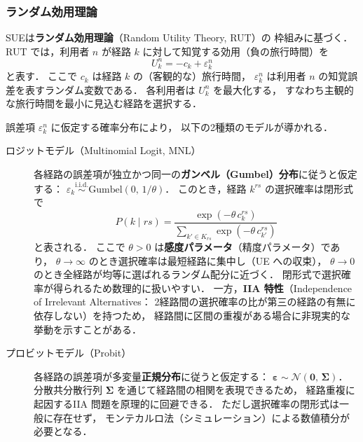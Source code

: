 \subsubsection*{ランダム効用理論}

SUEは\textbf{ランダム効用理論}（Random Utility Theory, RUT）の
枠組みに基づく\cite{McFadden1974}．
RUT では，利用者 $n$ が経路 $k$ に対して知覚する効用（負の旅行時間）を
\begin{equation}
  U_k^n = -c_k + \varepsilon_k^n
  \label{eq:rum}
\end{equation}
と表す．
ここで $c_k$ は経路 $k$ の（客観的な）旅行時間，
$\varepsilon_k^n$ は利用者 $n$ の知覚誤差を表すランダム変数である．
各利用者は $U_k^n$ を最大化する，
すなわち主観的な旅行時間を最小に見込む経路を選択する．

誤差項 $\varepsilon_k^n$ に仮定する確率分布により，
以下の2種類のモデルが導かれる\cite{Daganzo1977,Sheffi1985}．

\begin{description}
  \item[ロジットモデル（Multinomial Logit, MNL）]
    各経路の誤差項が独立かつ同一の\textbf{ガンベル（Gumbel）分布}に従うと仮定する：
    $\varepsilon_k \overset{\mathrm{i.i.d.}}{\sim} \mathrm{Gumbel}(0,\, 1/\theta)$．
    このとき，経路 $k^{rs}$ の選択確率は閉形式で
    \begin{equation}
      P(k \mid rs) = \frac{\exp(-\theta\, c_k^{rs})}
                         {\displaystyle\sum_{k' \in K_{rs}} \exp(-\theta\, c_{k'}^{rs})}
      \label{eq:logit-prob}
    \end{equation}
    と表される\cite{McFadden1974}．
    ここで $\theta > 0$ は\textbf{感度パラメータ}（精度パラメータ）であり，
    $\theta \to \infty$ のとき選択確率は最短経路に集中し（UE への収束），
    $\theta \to 0$ のとき全経路が均等に選ばれるランダム配分に近づく．
    閉形式で選択確率が得られるため数理的に扱いやすい．
    一方，\textbf{IIA 特性}（Independence of Irrelevant Alternatives：
    2経路間の選択確率の比が第三の経路の有無に依存しない）を持つため，
    経路間に区間の重複がある場合に非現実的な挙動を示すことがある．

  \item[プロビットモデル（Probit）]
    各経路の誤差項が多変量\textbf{正規分布}に従うと仮定する：
    $\boldsymbol{\varepsilon} \sim \mathcal{N}(\boldsymbol{0},\, \boldsymbol{\Sigma})$．
    分散共分散行列 $\boldsymbol{\Sigma}$ を通じて経路間の相関を表現できるため，
    経路重複に起因するIIA 問題を原理的に回避できる．
    ただし選択確率の閉形式は一般に存在せず，
    モンテカルロ法（シミュレーション）による数値積分が必要となる\cite{Daganzo1977}．
\end{description}


